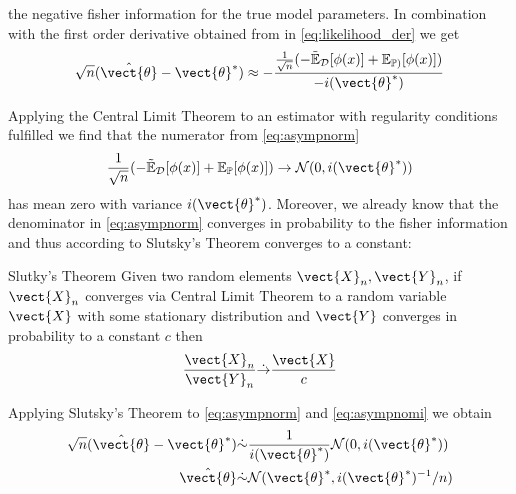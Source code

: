       the negative fisher information for the true model parameters.
      In combination with the first order derivative obtained from in \autoref{eq:likelihood_der} we get 
      \begin{equation}
        \label{eq:asympnorm}
          \begin{split}
            \sqrt{n}(\hat{\vect{\theta}} - \vect{\theta}^*)  &\approx - \frac{\frac{1}{\sqrt{n}}( -\tilde{\mathbb{E}}_{\mathcal{D}}[\phi(x)] + \mathbb{E}_{\mathbb{P})}[\phi(x)])}{- i(\vect{\theta}^*)} \\
          \end{split}
      \end{equation}

      Applying the Central Limit Theorem to an estimator with regularity conditions fulfilled we find  that the numerator from \autoref{eq:asympnorm}
        \begin{equation}
            \label{eq:asympnomi}
            \frac{1}{\sqrt{n}} ( -\tilde{\mathbb{E}}_{\mathcal{D}}[\phi(x)] + \mathbb{E}_{\mathbb{P}}[\phi(x)]) \rightarrow \mathcal{N}(0, i(\vect{\theta}^*))
        \end{equation}
        has mean zero with variance $i(\vect{\theta}^*)$.
        Moreover, we already know that the denominator in \autoref{eq:asympnorm} converges in probability to the fisher information and thus according to Slutsky's Theorem converges to a constant:

        \begin{threm}{Slutky's Theorem \cite{casella2002statistical}}
            Given two random elements $\vect{X}_n, \vect{Y}_n$, if $\vect{X}_n$ converges via Central Limit Theorem to a random variable $\vect{X}$ with some stationary distribution and $\vect{Y}$ converges in probability to a constant $c$ then 
            \begin{equation}
                \frac{\vect{X}_n}{\vect{Y}_n} \dot{\rightarrow} \frac{\vect{X}}{c}
            \end{equation}
        \end{threm}

        Applying Slutsky's Theorem to \autoref{eq:asympnorm} and \autoref{eq:asympnomi} we obtain 
        \begin{equation}
            \begin{split}
            \sqrt{n}(\hat{\vect{\theta}} - \vect{\theta}^*)  &\dot{\sim} \frac{1}{ i(\vect{\theta}^*)} \mathcal{N}(0, i(\vect{\theta}^*)) \\
            \hat{\vect{\theta}} &\dot{\sim} \mathcal{N}(\vect{\theta}^*, i(\vect{\theta}^*)^{-1}/n)\\
        \end{split}
        \end{equation}


